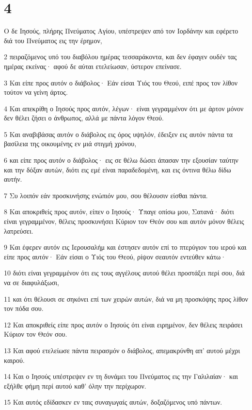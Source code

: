 \chapter{4}

\par Ο δε Ιησούς, πλήρης Πνεύματος Αγίου, υπέστρεψεν από τον Ιορδάνην και εφέρετο διά του Πνεύματος εις την έρημον,
\par 2 πειραζόμενος υπό του διαβόλου ημέρας τεσσαράκοντα, και δεν έφαγεν ουδέν τας ημέρας εκείνας· αφού δε αύται ετελείωσαν, ύστερον επείνασε.
\par 3 Και είπε προς αυτόν ο διάβολος· Εάν είσαι Υιός του Θεού, ειπέ προς τον λίθον τούτον να γείνη άρτος.
\par 4 Και απεκρίθη ο Ιησούς προς αυτόν, λέγων· είναι γεγραμμένον ότι με άρτον μόνον δεν θέλει ζήσει ο άνθρωπος, αλλά με πάντα λόγον Θεού.
\par 5 Και αναβιβάσας αυτόν ο διάβολος εις όρος υψηλόν, έδειξεν εις αυτόν πάντα τα βασίλεια της οικουμένης εν μιά στιγμή χρόνου,
\par 6 και είπε προς αυτόν ο διάβολος· εις σε θέλω δώσει άπασαν την εξουσίαν ταύτην και την δόξαν αυτών, διότι εις εμέ είναι παραδεδομένη, και εις όντινα θέλω δίδω αυτήν.
\par 7 Συ λοιπόν εάν προσκυνήσης ενώπιόν μου, σου θέλουσιν είσθαι πάντα.
\par 8 Και αποκριθείς προς αυτόν, είπεν ο Ιησούς· Ύπαγε οπίσω μου, Σατανά· διότι είναι γεγραμμένον, θέλεις προσκυνήσει Κύριον τον Θεόν σου και αυτόν μόνον θέλεις λατρεύσει.
\par 9 Και έφερεν αυτόν εις Ιερουσαλήμ και έστησεν αυτόν επί το πτερύγιον του ιερού και είπε προς αυτόν· Εάν είσαι ο Υιός του Θεού, ρίψον σεαυτόν εντεύθεν κάτω·
\par 10 διότι είναι γεγραμμένον ότι εις τους αγγέλους αυτού θέλει προστάξει περί σου, διά να σε διαφυλάξωσι,
\par 11 και ότι θέλουσι σε σηκόνει επί των χειρών αυτών, διά να μη προσκόψης προς λίθον τον πόδα σου.
\par 12 Και αποκριθείς είπε προς αυτόν ο Ιησούς ότι είναι ειρημένον, δεν θέλεις πειράσει Κύριον τον Θεόν σου.
\par 13 Και αφού ετελείωσε πάντα πειρασμόν ο διάβολος, απεμακρύνθη απ' αυτού μέχρι καιρού.
\par 14 Και ο Ιησούς υπέστρεψεν εν τη δυνάμει του Πνεύματος εις την Γαλιλαίαν· και εξήλθε φήμη περί αυτού καθ' όλην την περίχωρον.
\par 15 Και αυτός εδίδασκεν εν ταις συναγωγαίς αυτών, δοξαζόμενος υπό πάντων.
